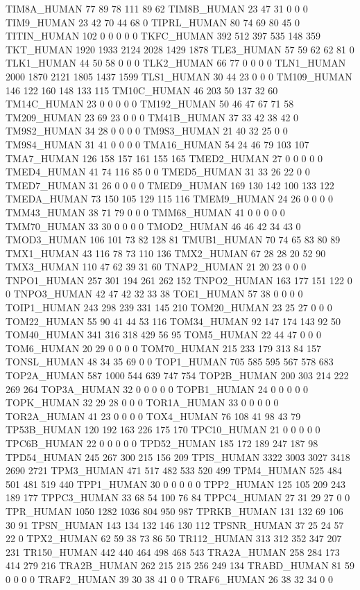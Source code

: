 TIM8A_HUMAN	77	89	78	111	89	62
TIM8B_HUMAN	23	47	31	0	0	0
TIM9_HUMAN	23	42	70	44	68	0
TIPRL_HUMAN	80	74	69	80	45	0
TITIN_HUMAN	102	0	0	0	0	0
TKFC_HUMAN	392	512	397	535	148	359
TKT_HUMAN	1920	1933	2124	2028	1429	1878
TLE3_HUMAN	57	59	62	62	81	0
TLK1_HUMAN	44	50	58	0	0	0
TLK2_HUMAN	66	77	0	0	0	0
TLN1_HUMAN	2000	1870	2121	1805	1437	1599
TLS1_HUMAN	30	44	23	0	0	0
TM109_HUMAN	146	122	160	148	133	115
TM10C_HUMAN	46	203	50	137	32	60
TM14C_HUMAN	23	0	0	0	0	0
TM192_HUMAN	50	46	47	67	71	58
TM209_HUMAN	23	69	23	0	0	0
TM41B_HUMAN	37	33	42	38	42	0
TM9S2_HUMAN	34	28	0	0	0	0
TM9S3_HUMAN	21	40	32	25	0	0
TM9S4_HUMAN	31	41	0	0	0	0
TMA16_HUMAN	54	24	46	79	103	107
TMA7_HUMAN	126	158	157	161	155	165
TMED2_HUMAN	27	0	0	0	0	0
TMED4_HUMAN	41	74	116	85	0	0
TMED5_HUMAN	31	33	26	22	0	0
TMED7_HUMAN	31	26	0	0	0	0
TMED9_HUMAN	169	130	142	100	133	122
TMEDA_HUMAN	73	150	105	129	115	116
TMEM9_HUMAN	24	26	0	0	0	0
TMM43_HUMAN	38	71	79	0	0	0
TMM68_HUMAN	41	0	0	0	0	0
TMM70_HUMAN	33	30	0	0	0	0
TMOD2_HUMAN	46	46	42	34	43	0
TMOD3_HUMAN	106	101	73	82	128	81
TMUB1_HUMAN	70	74	65	83	80	89
TMX1_HUMAN	43	116	78	73	110	136
TMX2_HUMAN	67	28	28	20	52	90
TMX3_HUMAN	110	47	62	39	31	60
TNAP2_HUMAN	21	20	23	0	0	0
TNPO1_HUMAN	257	301	194	261	262	152
TNPO2_HUMAN	163	177	151	122	0	0
TNPO3_HUMAN	42	47	42	32	33	38
TOE1_HUMAN	57	38	0	0	0	0
TOIP1_HUMAN	243	298	239	331	145	210
TOM20_HUMAN	23	25	27	0	0	0
TOM22_HUMAN	55	90	41	44	53	116
TOM34_HUMAN	92	147	174	143	92	50
TOM40_HUMAN	341	316	318	429	56	95
TOM5_HUMAN	22	44	47	0	0	0
TOM6_HUMAN	20	29	0	0	0	0
TOM70_HUMAN	215	233	179	313	84	157
TONSL_HUMAN	48	34	35	69	0	0
TOP1_HUMAN	705	585	595	567	578	683
TOP2A_HUMAN	587	1000	544	639	747	754
TOP2B_HUMAN	200	303	214	222	269	264
TOP3A_HUMAN	32	0	0	0	0	0
TOPB1_HUMAN	24	0	0	0	0	0
TOPK_HUMAN	32	29	28	0	0	0
TOR1A_HUMAN	33	0	0	0	0	0
TOR2A_HUMAN	41	23	0	0	0	0
TOX4_HUMAN	76	108	41	98	43	79
TP53B_HUMAN	120	192	163	226	175	170
TPC10_HUMAN	21	0	0	0	0	0
TPC6B_HUMAN	22	0	0	0	0	0
TPD52_HUMAN	185	172	189	247	187	98
TPD54_HUMAN	245	267	300	215	156	209
TPIS_HUMAN	3322	3003	3027	3418	2690	2721
TPM3_HUMAN	471	517	482	533	520	499
TPM4_HUMAN	525	484	501	481	519	440
TPP1_HUMAN	30	0	0	0	0	0
TPP2_HUMAN	125	105	209	243	189	177
TPPC3_HUMAN	33	68	54	100	76	84
TPPC4_HUMAN	27	31	29	27	0	0
TPR_HUMAN	1050	1282	1036	804	950	987
TPRKB_HUMAN	131	132	69	106	30	91
TPSN_HUMAN	143	134	132	146	130	112
TPSNR_HUMAN	37	25	24	57	22	0
TPX2_HUMAN	62	59	38	73	86	50
TR112_HUMAN	313	312	352	347	207	231
TR150_HUMAN	442	440	464	498	468	543
TRA2A_HUMAN	258	284	173	414	279	216
TRA2B_HUMAN	262	215	215	256	249	134
TRABD_HUMAN	81	59	0	0	0	0
TRAF2_HUMAN	39	30	38	41	0	0
TRAF6_HUMAN	26	38	32	34	0	0
